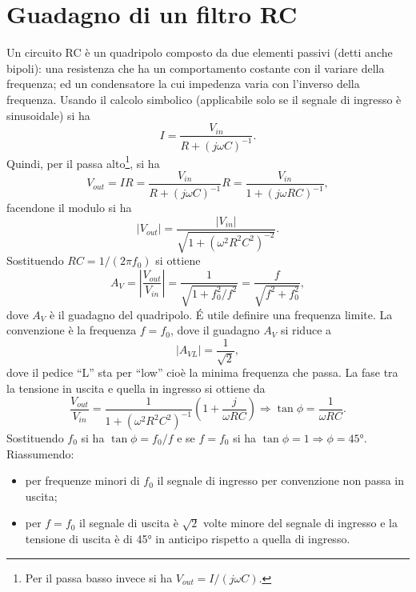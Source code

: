 \section{Guadagno di un filtro RC}
Un circuito RC è un quadripolo composto da due elementi passivi (detti anche bipoli): una resistenza che ha un comportamento costante con il variare della frequenza; ed un condensatore la cui impedenza varia con l'inverso della frequenza. Usando il calcolo simbolico (applicabile solo se il segnale di ingresso è sinusoidale) si ha
\begin{equation}
    I = \frac{V_{in}}{R + (j\omega C)^{-1}}.
\end{equation}
Quindi, per il passa alto\footnote{Per il passa basso invece si ha $V_{out}=I/(j\omega C)$.}, si ha
\begin{equation}
 V_{out} = IR = \frac{V_{in}}{R + (j\omega C)^{-1}} R = \frac{V_{in}}{1 + (j\omega RC)^{-1}},
\end{equation}
facendone il modulo si ha 
\begin{equation}
    \left| V_{out} \right| = \frac{\left| V_{in} \right|}{\sqrt{1 + (\omega^2 R^2 C^2)^{-2}}}.
    \label{eq:placeholder}
\end{equation}
Sostituendo $RC=1/(2\pi f_0)$ si ottiene
\begin{equation}
A_V=\left| \frac{V_{out}}{V_{in}} \right| = \frac{1}{\sqrt{1 + f_0^2/f^2}} = \frac{f}{\sqrt{f^2 + f_0^2}},
\end{equation}
dove $A_V$ è il guadagno del quadripolo. \'E utile definire una frequenza limite. La convenzione è la frequenza $f = f_0$, dove il guadagno $A_V$ si riduce a
\begin{equation}
    |A_{VL}|=\frac{1}{\sqrt{2}},
\end{equation}
dove il pedice ``L'' sta per ``low'' cioè la minima frequenza che passa. La fase tra la tensione in uscita e quella in ingresso si ottiene da
\begin{equation}
\frac{V_{out}}{V_ {in}} = \frac{1}{1 + (\omega^2 R^2 C^2)^{-1}}\left(1 + \frac{j}{\omega RC}\right)\Rightarrow\tan{\phi}=\frac{1}{\omega RC}.
\end{equation}
Sostituendo $f_0$ si ha $\tan{\phi}=f_0/f$ e se $f=f_0$ si ha $\tan{\phi}=1\Rightarrow\phi=45$°.
Riassumendo:
\begin{itemize}
    \item per frequenze minori di $f_0$ il segnale di ingresso per convenzione non passa in uscita;
    \item per $f = f_0$ il segnale di uscita è $\sqrt{2}$ volte minore del segnale di ingresso e la tensione di uscita è di 45° in anticipo rispetto a quella di ingresso.
\end{itemize}
